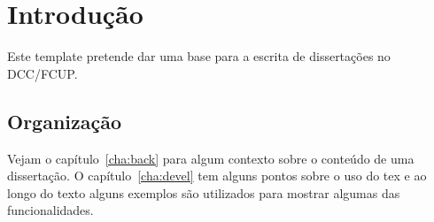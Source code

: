 \chapter{Introdução}\label{chap:intro}

Este template pretende dar uma base para a escrita de dissertações no \ac{DCC}/\ac{FCUP}.

\section{Organização}
Vejam o capítulo~\ref{cha:back} para algum contexto sobre o conteúdo de uma dissertação. O capítulo~\ref{cha:devel} tem alguns pontos sobre o uso do tex e ao longo do texto alguns exemplos são utilizados para mostrar algumas das funcionalidades.




